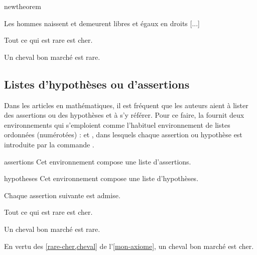 \documentclass[french,nolocaltoc]{nwejmart}
\newtheorem{article}
\newtheorem[title=Fait,style=definition]{fact}
\begin{document}
\begin{docCommand}{newtheorem}{}
\begin{bodycode}
\begin{article}
Les hommes naissent et demeurent libres et égaux en droits [...]
\end{article}
\begin{fact*}
Tout ce qui est rare est cher.
\end{fact*}
\begin{fact}
Un cheval bon marché est rare.
\end{fact}
\end{bodycode}
\end{docCommand}

\subsection{Listes d'hypothèses ou d'assertions}
\label{sec:list-dhyp-ou}

Dans les articles en mathématiques, il est fréquent que les auteurs aient
à lister des assertions ou des hypothèses et à s'y référer. Pour ce faire, la
\nwejmauthorcl{} fournit deux environnements qui s'emploient comme l'habituel
environnement  de listes ordonnées (numérotées) :
 et , dans lesquels chaque assertion ou
hypothèse est introduite par la commande .

\begin{docEnvironment}[doclang/environment content=assertions]{assertions}{}
  Cet environnement compose une liste d'assertions.
\end{docEnvironment}
\begin{docEnvironment}[doclang/environment content=hypothèses]{hypotheses}{}
  Cet environnement compose une liste d'hypothèses.
\end{docEnvironment}

\begin{bodycode}
\begin{axiom}\label{mon-axiome}
  Chaque assertion suivante est admise.
  \begin{assertions}
  \item\label{rare-cher} Tout ce qui est rare est cher.
  \item\label{cheval} Un cheval bon marché est rare.
  \end{assertions}
\end{axiom}
En vertu des \vref{rare-cher,cheval} de l'\vref{mon-axiome},
un cheval bon marché est cher.
\end{bodycode}
\end{document}
